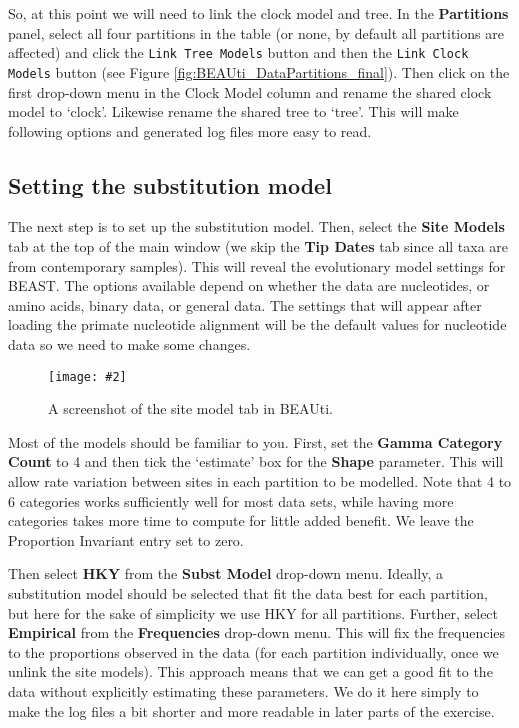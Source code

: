 \documentclass[11pt]{article}
\theoremstyle{plain}%
\theoremstyle{definition}
\theoremstyle{remark}
\newcommand{\includeimage}[2][]{%
\texttt{[image: \#2]}
}
\begin{document}
So, at this point we will need to link the clock model and tree. In the {\bf Partitions} panel, select all four partitions in the table (or none, by default all partitions are affected) and click the \texttt{Link Tree Models} button and then the \texttt{Link Clock Models} button (see Figure \ref{fig:BEAUti_DataPartitions_final}). Then click on the first drop-down menu in the Clock Model column and rename the shared clock model to `clock'. Likewise rename the shared tree to `tree'. This will make following options and generated log files more easy to read.


\subsection{Setting the substitution model}

The next step is to set up the substitution model. 
Then, select the {\bf Site Models} tab at the top of the main window (we skip the {\bf Tip Dates} tab since all taxa are from contemporary
samples). This will reveal the evolutionary model settings for BEAST. The options available depend on whether the data are nucleotides, or amino acids, binary data, or general data. The settings that will appear after loading the primate nucleotide alignment will be the default values for nucleotide data so we need to make some changes. 

\begin{figure}
\centering	
\includeimage[width=0.9\textwidth]{figures/BEAUti_Model}
\label{fig:BEAUti_Model}
\caption{A screenshot of the site model tab in BEAUti.}
\end{figure}

Most of the models should be familiar to you. %
First, set the \textbf{Gamma Category Count} to 4 and then tick the `estimate' box for the \textbf{Shape} parameter. This will allow rate variation 
between sites in each partition to be modelled.  Note that 4 to 6 categories works sufficiently well for most data
sets, while having more categories takes more time to compute for little added benefit. We leave the Proportion Invariant entry set to zero.

Then select  \textbf{HKY} from the \textbf{Subst Model} drop-down menu. Ideally, a substitution model should be selected that fit the data best for each partition, but here for the sake of simplicity we use HKY for all partitions. Further, select \textbf{Empirical} from the \textbf{Frequencies} drop-down menu. This will fix the frequencies to the proportions observed in the data (for each partition individually, once we unlink the site models). This approach means that we can get a good fit to the data without explicitly estimating these parameters. We do it here simply to make the log files a bit shorter and more readable in later parts of the exercise. 
\end{document}

